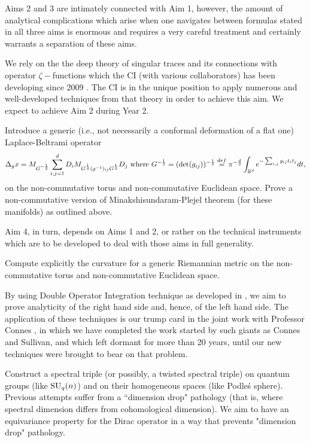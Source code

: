 \documentclass[12pt]{article}
\begin{document}
Aims 2 and 3 are intimately connected with Aim 1, however, the amount of analytical complications which arise when one navigates between formulas stated in all three aims is enormous and requires a very careful treatment and certainly warrants a separation of these aims.

We rely on the the deep theory of singular traces and its connections with operator $\zeta-$functions which the CI (with various collaborators) has been developing since 2009 \cite{book,SUZ-indiana}. The CI is in the unique position to apply numerous and well-developed techniques from that theory in order to achieve this aim.  We expect to achieve Aim 2 during Year 2.

 Introduce a generic (i.e., not necessarily a conformal deformation of a flat one) Laplace-Beltrami operator
$$\Delta_g x=M_{G^{-\frac12}}\sum_{i,j=1}^dD_iM_{G^{\frac14}(g^{-1})_{ij}G^{\frac14}}D_j\mbox{ where }G^{-\frac12}=({\rm det}(g_{ij}))^{-\frac12}\stackrel{def}{=}\pi^{-\frac{d}{2}}\int_{\mathbb{R}^d}e^{-\sum_{i,j}g_{ij}t_it_j}dt,$$
on the non-commutative torus and non-commutative Euclidean space. Prove a non-commutative version of Minakshisundaram-Plejel theorem (for these manifolds) as outlined above.

Aim 4, in turn, depends on Aims 1 and 2, or rather on the technical instruments which are to be developed to deal with those aims in full generality.

 Compute explicitly the curvature for a generic Riemannian metric on the non-commutative torus and non-commutative Euclidean space.

By using Double Operator Integration technique as developed in \cite{PotapovSukochev}, we aim to prove analyticity of the right hand side and, hence, of the left hand side. The application of these techniques is our trump card in the joint work with Professor Connes \cite{Connes_team}, in which we have completed the work started by such giants as Connes and Sullivan, and which left dormant for more than 20 years, until our new techniques were brought to bear on that problem.

 Construct a spectral triple (or possibly, a twisted spectral triple) on quantum groups (like ${\rm SU}_q(n)$) and on their homogeneous spaces (like Podle\'s sphere). Previous attempts \cite{ChakrabortyPal} suffer from a ``dimension drop" pathology (that is, where spectral dimension differs from cohomological dimension). We aim to have an equivariance property for the Dirac operator in a way that prevents "dimension drop" pathology. 
\end{document}
